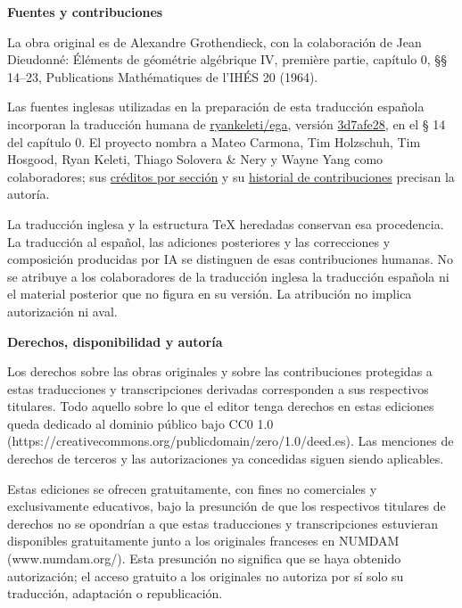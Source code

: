 \documentclass[10pt,oneside]{book}
\begin{document}
\begingroup
\small

\noindent\textbf{Fuentes y contribuciones}

La obra original es de Alexandre Grothendieck, con la colaboración de Jean Dieudonné: Éléments de géométrie algébrique IV, première partie, capítulo 0, §§ 14–23, Publications Mathématiques de l’IHÉS 20 (1964).

Las fuentes inglesas utilizadas en la preparación de esta traducción española incorporan la traducción humana de \href{https://github.com/ryankeleti/ega}{ryankeleti/ega}, versión \href{https://github.com/ryankeleti/ega/tree/3d7afe28c99d1887ccdb85acf2ca1afd93fb1971}{3d7afe28}, en el § 14 del capítulo 0. El proyecto nombra a Mateo Carmona, Tim Holzschuh, Tim Hosgood, Ryan Keleti, Thiago Solovera \& Nery y Wayne Yang como colaboradores; sus \href{https://github.com/ryankeleti/ega/blob/3d7afe28c99d1887ccdb85acf2ca1afd93fb1971/README.md}{créditos por sección} y su \href{https://github.com/ryankeleti/ega/commits/3d7afe28c99d1887ccdb85acf2ca1afd93fb1971}{historial de contribuciones} precisan la autoría.

La traducción inglesa y la estructura TeX heredadas conservan esa procedencia. La traducción al español, las adiciones posteriores y las correcciones y composición producidas por IA se distinguen de esas contribuciones humanas. No se atribuye a los colaboradores de la traducción inglesa la traducción española ni el material posterior que no figura en su versión. La atribución no implica autorización ni aval.

\par\medskip
\noindent\textbf{Derechos, disponibilidad y autoría}

Los derechos sobre las obras originales y sobre las contribuciones protegidas a estas traducciones y transcripciones derivadas corresponden a sus respectivos titulares. Todo aquello sobre lo que el editor tenga derechos en estas ediciones queda dedicado al dominio público bajo CC0 1.0 (https://creativecommons.org/publicdomain/zero/1.0/deed.es). Las menciones de derechos de terceros y las autorizaciones ya concedidas siguen siendo aplicables.

Estas ediciones se ofrecen gratuitamente, con fines no comerciales y exclusivamente educativos, bajo la presunción de que los respectivos titulares de derechos no se opondrían a que estas traducciones y transcripciones estuvieran disponibles gratuitamente junto a los originales franceses en NUMDAM (www.numdam.org/). Esta presunción no significa que se haya obtenido autorización; el acceso gratuito a los originales no autoriza por sí solo su traducción, adaptación o republicación.
\end{document}

